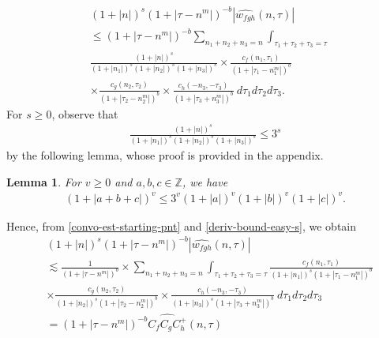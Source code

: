 \documentclass[12pt,reqno]{amsart}
\numberwithin{equation}{section}  %
\numberwithin{figure}{section}
\newcommand{\zz}{\mathbb{Z}}
\newcommand{\wh}{\widehat}
\theoremstyle{plain}
\newtheorem{lemma}{Lemma}
\theoremstyle{definition}
\theoremstyle{remark}
\begin{document}
\begin{equation}
	\label{convo-est-starting-pnt}
	\begin{split}
		 & \left (1 + |n| \right )^s \left( 1 + | \tau - n^{m } | \right)^{-b} | \wh{w_{fgh}}\left( 
		n, \tau \right) |
		\\
		& \le \left( 1 + | \tau - n^{m } | \right)^{-b}
		\sum_{n_1+ n_2+ n_3= n} 
    \int_{\tau_{1} + \tau_{2} + \tau_{3} = \tau}
    \\
    & \frac{\left (1 + |n| \right )^s}{\left (1 +
		|n_1| \right )^s \left (1 + | n_2| \right )^s \left (1 + |n_3| \right )^s} 
		\times \frac{c_f(n_1, \tau_1)}{\left( 1 + | \tau_1 - n_1^{m } | 
		\right)^{b}}
		\\
		& \times
		\frac{c_g(n_2, \tau_2)}{\left( 1 + | \tau_2 - n_2^{m } | 
		\right)^{b}} \times
		\frac{c_h(-n_3, -\tau_3)}{\left( 1 + | \tau_3 + n_3^{m } | 
		\right)^{b}}\ d \tau_1 d \tau_2 d \tau_3.
	\end{split}
\end{equation}
%
%
For $s \ge 0$, observe that
%
%
\begin{equation}
	\label{deriv-bound-easy-s}
	\begin{split}
		\frac{\left (1 + |n| \right ) ^s}{\left (1 + |n_1| \right ) ^s \left (1 + |n_2| \right ) ^s \left (1 + |n_3| \right ) ^s} 
		\le 3^{s}
	\end{split}
\end{equation}
%
%
by the following lemma, whose proof is provided in the appendix.
%
%
\begin{lemma}
\label{lem:splitting}
	For $v \ge 0$ and $a, b, c \in \zz$, we have
%
%
\begin{equation}
	\label{splitting}
	\begin{split}
		\left ( 1 + |a +b + c| \right)^v \le 3^v \left(1 + | a | \right)^v \left(
		1 + | b | \right)^v \left( 1 + | c | \right)^v.
	\end{split}
\end{equation}
%
%
\end{lemma}
%
%
Hence, from \eqref{convo-est-starting-pnt} and \eqref{deriv-bound-easy-s}, we 
obtain
%
\begin{equation*}
	\begin{split}
		& \left (1 + |n| \right )^s \left( 1 +  | \tau - n^{m }  | \right)^{-b} | 
		\wh{w_{fgh}}\left( n, \tau \right) | 
		\\
    & \lesssim  \frac{1}{\left( 1 +
		| \tau - n^{m}| 
		\right)^{b}}  
		\times
		\sum_{n_1+ n_2+ n_3= n} 
    \int_{\tau_{1} + \tau_{2} + \tau_{3} = \tau} \frac{c_f\left( n_1, \tau_1 
		\right)}{\left (1 + |n_1| \right )^s \left( 1 + | \tau_1 - n_1^{m} |
		\right)^{b}}
		\\
		& \times \frac{c_{g}\left( n_2, \tau_2 \right)}{\left (1 + |n_2| \right ) 
		^s\left( 1 + | \tau_2 -  n_2^{m }| 
		\right)^{b}}
    \times \frac{c_{h}\left( -n_3, -\tau_3 \right)}{\left (1 + |n_3| \right )
    ^s\left( 1 + | \tau_3 + n_3^{m } | \right)^{b}} \ d \tau_1 d \tau_2 d \tau_3
    \\
		& = \left( 1 + | \tau - n^{m } | \right)^{-b}
		\wh{C_f C_{g} C^+_{h}} \left( n, \tau \right)
	\end{split}
\end{equation*}
\end{document}
